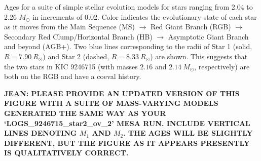 \label{fig:mesa} Ages for a suite of simple stellar evolution models for stars ranging from 2.04 to 2.26 $M_{\odot}$ in increments of 0.02. Color indicates the evolutionary state of each star as it moves from the Main Sequence (MS) $\rightarrow$ Red Giant Branch (RGB) $\rightarrow$ Secondary Red Clump/Horizontal Branch (HB) $\rightarrow$ Asymptotic Giant Branch and beyond (AGB+). Two blue lines corresponding to the radii of Star 1 (solid, $R = 7.90 \ R_\odot$) and Star 2 (dashed, $R = 8.33 \ R_\odot$) are shown. This suggests that the two stars in KIC 9246715 (with masses $2.16$ and $2.14 \ M_\odot$, respectively) are both on the RGB and have a coeval history.

\textbf{JEAN: PLEASE PROVIDE AN UPDATED VERSION OF THIS FIGURE WITH A SUITE OF MASS-VARYING MODELS GENERATED THE SAME WAY AS YOUR `LOGS_9246715_star2_ov_2' MESA RUN. INCLUDE VERTICAL LINES DENOTING $M_1$ AND $M_2$. THE AGES WILL BE SLIGHTLY DIFFERENT, BUT THE FIGURE AS IT APPEARS PRESENTLY IS QUALITATIVELY CORRECT.}
  
  
  